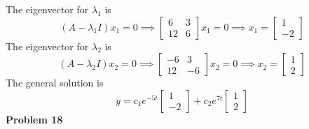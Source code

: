 The eigenvector for $\lambda_1$ is 
\[
    (A-\lambda_1 I)x_1 = 0
    \implies 
    \begin{bmatrix}
        6 & 3 \\
        12 & 6
    \end{bmatrix} x_1 = 0
    \implies x_1 = 
    \begin{bmatrix}
        1 \\ -2
    \end{bmatrix}
\]
The eigenvector for $\lambda_2$ is 
\[
    (A-\lambda_2 I)x_2 = 0
    \implies 
    \begin{bmatrix}
        -6 & 3 \\
        12 & -6
    \end{bmatrix} x_2 = 0
    \implies x_2 = 
    \begin{bmatrix}
        1 \\ 2
    \end{bmatrix}
\]
The general solution is 
\[
    y = c_1e^{-5t} \begin{bmatrix} 1 \\ -2 \end{bmatrix} +
    c_2e^{7t} \begin{bmatrix} 1 \\ 2 \end{bmatrix}
\]
\textbf{Problem 18}
